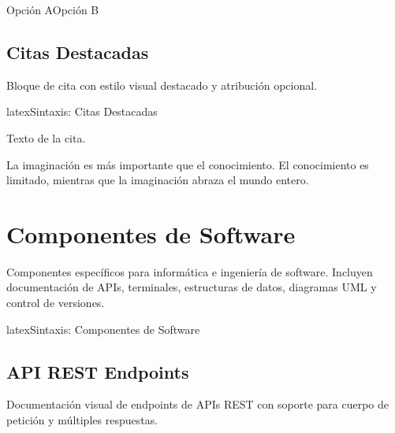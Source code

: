 \begin{comparison}{Opción A}{Opción B}
\end{comparison}

\subsection{Citas Destacadas}
\label{subsec:citas}

Bloque de cita con estilo visual destacado y atribución opcional.

\begin{codigosimple}{latex}{Sintaxis: Citas Destacadas}
\begin{quotebox}[Autor]
  Texto de la cita.
\end{quotebox}
\end{codigosimple}

\begin{quotebox}
  La imaginación es más importante que el conocimiento. El conocimiento
  es limitado, mientras que la imaginación abraza el mundo entero.
\end{quotebox}


\section{Componentes de Software}
\label{sec:comp-software}

Componentes específicos para informática e ingeniería de software. Incluyen
documentación de APIs, terminales, estructuras de datos, diagramas UML y
control de versiones.

\begin{codigosimple}{latex}{Sintaxis: Componentes de Software}
\usepackage[software]{eps-componentes}
\end{codigosimple}

\subsection{API REST Endpoints}
\label{subsec:api}

Documentación visual de endpoints de APIs REST con soporte para cuerpo de
petición y múltiples respuestas.

